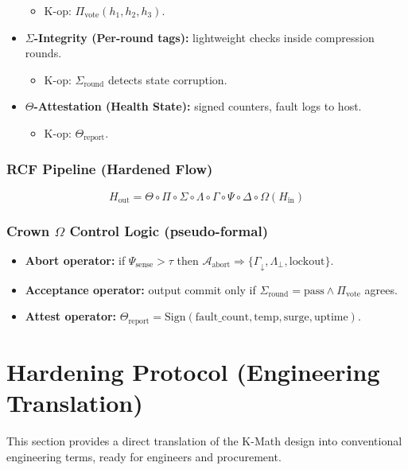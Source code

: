 \documentclass[11pt, a4paper]{article}
\begin{document}
\begin{itemize}
        \begin{itemize}
            \item K-op: $\Pi_{\text{vote}}(h_1,h_2,h_3)$.
        \end{itemize}
    \item \textbf{$\Sigma$-Integrity (Per-round tags):} lightweight checks inside compression rounds.
        \begin{itemize}
            \item K-op: $\Sigma_{\text{round}}$ detects state corruption.
        \end{itemize}
    \item \textbf{$\Theta$-Attestation (Health State):} signed counters, fault logs to host.
        \begin{itemize}
            \item K-op: $\Theta_{\text{report}}$.
        \end{itemize}
\end{itemize}

\section{RCF Pipeline (Hardened Flow)}
$$ H_{\text{out}}=\Theta\circ\Pi\circ\Sigma\circ\Lambda\circ\Gamma\circ\Psi\circ\Delta\circ\Omega(H_{\text{in}}) $$

\section{Crown $\Omega$ Control Logic (pseudo-formal)}
\begin{itemize}
    \item \textbf{Abort operator:} if $\Psi_{\text{sense}} > \tau$ then $\mathcal{A}_{\text{abort}} \Rightarrow \{\Gamma_{\downarrow}, \Lambda_{\perp}, \text{lockout}\}$.
    \item \textbf{Acceptance operator:} output commit only if $\Sigma_{\text{round}}=\text{pass} \land \Pi_{\text{vote}}$ agrees.
    \item \textbf{Attest operator:} $\Theta_{\text{report}}=\text{Sign}(\text{fault\_count},\text{temp},\text{surge},\text{uptime})$.
\end{itemize}

\newpage
\part{Hardening Protocol (Engineering Translation)}
\label{part:engineering_translation}
This section provides a direct translation of the K-Math design into conventional engineering terms, ready for engineers and procurement.
\end{document}
